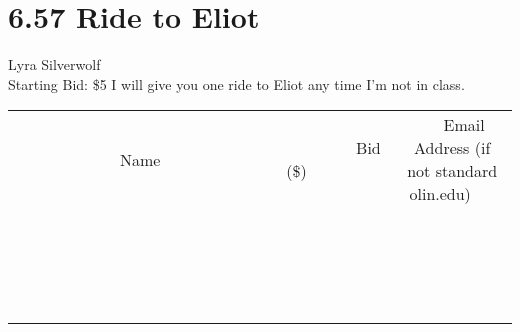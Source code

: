 \documentclass[11pt]{article}
\begin{document}
\section*{6.57 Ride to Eliot}
Lyra Silverwolf
\\
Starting Bid: \$5
\newline
I will give you one ride to Eliot any time I'm not in class.
\\[3ex]
\begin{tabular}{c c c}
~~~~~~~~~~~~~Name~~~~~~~~~~~~~ & ~~~~~~~~~Bid (\$)~~~~~~~~~  & ~~~Email Address (if not standard olin.edu)~~~\\
 & & \\
\hline
 & & \\
\hline
 & & \\
\hline
 & & \\
\hline
 & & \\
\hline
 & & \\
\hline
 & & \\
\hline
 & & \\
\hline
 & & \\
\hline
 & & \\
\hline
 & & \\
\hline
 & & \\
\hline
 & & \\
\hline
 & & \\
\hline
 & & \\
\hline
 & & \\
\hline
 & & \\
\hline
 & & \\
\hline
 & & \\
\hline
\end{tabular}
\newpage
\end{document}
